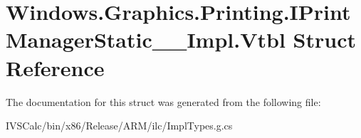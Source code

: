\hypertarget{struct_windows_1_1_graphics_1_1_printing_1_1_i_print_manager_static_____impl_1_1_vtbl}{}\section{Windows.\+Graphics.\+Printing.\+I\+Print\+Manager\+Static\+\_\+\+\_\+\+Impl.\+Vtbl Struct Reference}
\label{struct_windows_1_1_graphics_1_1_printing_1_1_i_print_manager_static_____impl_1_1_vtbl}


The documentation for this struct was generated from the following file\+:\begin{DoxyCompactItemize}
\item 
I\+V\+S\+Calc/bin/x86/\+Release/\+A\+R\+M/ilc/Impl\+Types.\+g.\+cs\end{DoxyCompactItemize}
